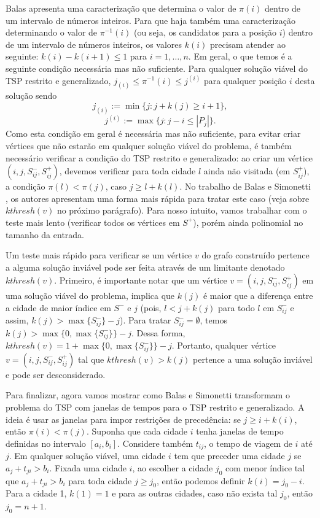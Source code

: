 \documentclass{article}
\begin{document}
     

Balas apresenta uma caracterização que determina o valor de $\pi(i)$ dentro de um intervalo de números inteiros. Para que haja também uma caracterização determinando o valor de $\pi^{-1}(i)$ (ou seja, os candidatos para a posição $i$) dentro de um intervalo de números inteiros, os valores $k(i)$ precisam atender ao seguinte: $k(i) - k(i+1) \leq 1$ para $i = 1, \dots, n$. Em geral, o que temos é a seguinte condição necessária mas não suficiente. Para qualquer solução viável do TSP restrito e generalizado, $j_{(i)} \leq \pi^{-1}(i) \leq j^{(i)}$ para qualquer posição $i$ desta solução sendo $$j_{(i)} := \min\{j: j + k(j) \geq i+1\},$$ $$j^{(i)} := \max\{j: j - i \leq |P_j|\}.$$ Como esta condição em geral é necessária mas não suficiente, para evitar criar vértices que não estarão em qualquer solução viável do problema, é também necessário verificar a condição do TSP restrito e generalizado: ao criar um vértice $(i, j, S^-_{ij}, S^+_{ij})$, devemos verificar para toda cidade $l$ ainda não visitada (em $S^+_{ij}$), a condição $\pi(l) < \pi(j)$, caso  $j \geq l + k(l)$. No trabalho de Balas e Simonetti \cite{BS}, os autores apresentam uma forma mais rápida para tratar este caso (veja sobre $kthresh(v)$ no próximo parágrafo). Para nosso intuito, vamos trabalhar com o teste mais lento (verificar todos os vértices em $S^+$), porém ainda polinomial no tamanho da entrada.

Um teste mais rápido para verificar se um vértice $v$ do grafo construído pertence a alguma solução inviável pode ser feita através de um limitante denotado $kthresh(v)$. Primeiro, é importante notar que um vértice $v=(i, j, S^-_{ij}, S^+_{ij})$ em uma solução viável do problema, implica que $k(j)$ é maior que a diferença entre a cidade de maior índice em $S^-$ e $j$ (pois, $l < j + k(j)$ para todo $l$ em $S^-_{ij}$ e assim, $k(j) > \max\{S^-_{ij}\} - j$). Para tratar $S^-_{ij} = \emptyset$, temos $k(j) > \max\{0, \max\{S^-_{ij}\}\} - j$. Dessa forma, $kthresh(v) = 1+\max\{0, \max\{S^-_{ij}\}\} - j$. Portanto, qualquer vértice $v=(i,j,S^-_{ij}, S^+_{ij})$ tal que $kthresh(v) > k(j)$ pertence a uma solução inviável e pode ser desconsiderado.

Para finalizar, agora vamos mostrar como Balas e Simonetti transformam o problema do TSP com janelas de tempos para o TSP restrito e generalizado. A ideia é usar as janelas para impor restrições de precedência: se $j \geq i + k(i)$, então $\pi(i) < \pi(j)$. Suponha que cada cidade $i$ tenha janelas de tempo definidas no intervalo $[a_i, b_i]$. Considere também $t_{ij}$, o tempo de viagem de $i$ até $j$. Em qualquer solução viável, uma cidade $i$ tem que preceder uma cidade $j$ se $a_j + t_{ji} > b_i$. Fixada uma cidade $i$, ao escolher a cidade $j_0$ com menor índice tal que $a_j + t_{ji} > b_i$ para toda cidade $j \geq j_0$, então podemos definir $k(i)=j_0 - i$. Para a cidade 1, $k(1) = 1$ e para as outras cidades, caso não exista tal $j_0$, então $j_0=n+1$.
\end{document}
